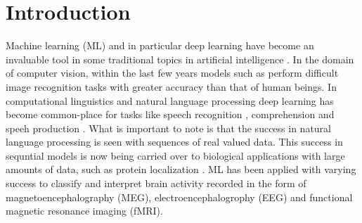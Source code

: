 \documentclass[utf8]{frontiersSCNS} %
\begin{document}
\section{Introduction}


Machine learning (ML) and in particular deep learning have become an invaluable tool in some traditional topics in artificial intelligence \cite{LeCun2015}. In the domain of computer vision, within the last few years models such as \cite{He2015a} perform difficult image recognition tasks with greater accuracy than that of human beings. In computational linguistics and natural language processing deep learning has become common-place for tasks like speech recognition \cite{Bahdanau}, comprehension \cite{Moritz} and speeh production \cite{VanDenOord}. What is important to note is that the success in natural language processing is seen with sequences of real valued data. This success in sequntial models is now being carried over to biological applications with large amounts of data, such as protein localization \cite{Sonderby2015}. ML has been applied with varying success to classify and interpret brain activity recorded in the form of magnetoencephalography (MEG), electroencephalogrophy (EEG) and functional magnetic resonance imaging (fMRI). %

\end{document}
